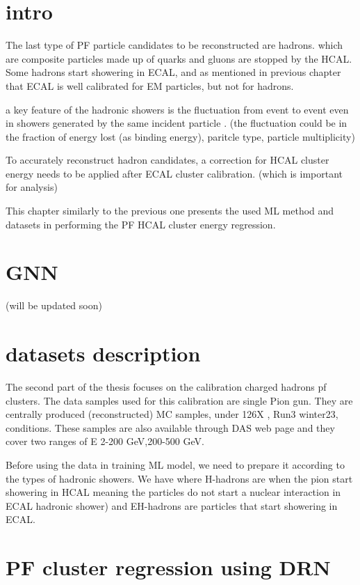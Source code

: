 \section{intro}

The last type of PF particle candidates to be reconstructed are hadrons. which are composite particles made up of quarks and gluons are stopped by the HCAL.
Some hadrons start showering in ECAL, and as mentioned in previous chapter that ECAL is well calibrated for EM particles, but not for hadrons.

a key feature of the hadronic showers is the fluctuation from event to event even in showers generated by the same incident particle . (the fluctuation could be in the fraction of energy lost (as binding energy), paritcle type, particle multiplicity) 

To accurately reconstruct hadron candidates, a correction for HCAL cluster energy needs to be applied after ECAL cluster calibration. (which is important for analysis) 

This chapter similarly to the previous one presents the used ML method and datasets in performing the PF HCAL cluster energy regression.

\section{GNN}
(will be updated soon) 

\section{datasets description}

The second part of the thesis focuses on the calibration charged hadrons pf clusters.
The data samples used for this calibration are single Pion gun.
They are centrally produced (reconstructed) MC samples, under 126X %
, Run3 winter23, conditions. These samples are also available through DAS web page and they cover two ranges of E 2-200 GeV,200-500 GeV.  

Before using the data in training ML model, we need to prepare it according to the types of hadronic showers.
We have where H-hadrons are when the pion start showering in HCAL meaning the particles do not start a nuclear interaction in ECAL hadronic shower) and EH-hadrons are particles that start showering in ECAL. 


\section{PF cluster regression using DRN}

